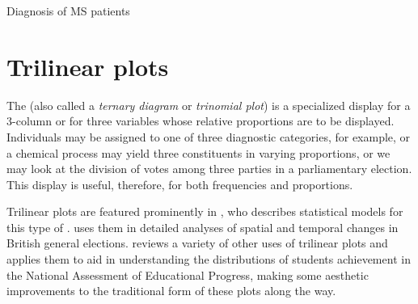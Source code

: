 \documentclass[10pt,krantz2]{krantz}\usepackage[]{graphicx}\usepackage[]{color}
\begin{document}
\begin{Example}[MS2]{Diagnosis of MS patients}

\end{Example}

\section{Trilinear plots}\label{sec:twoway-trilinear}

The 
(also called a \emph{ternary diagram} or \emph{trinomial plot})
is a specialized display for a 3-column \ctab or for
three variables whose relative proportions are to be displayed.
Individuals may be assigned to one of three diagnostic categories,
for example, or a chemical process may yield three constituents
in varying proportions, or we may look at the division of votes
among three parties in a parliamentary election.
This display is useful, therefore, for both frequencies
and proportions.

Trilinear plots are featured prominently in \citet{Aitchison:86},
who describes statistical models for this type of
.  \citet{Upton:76,Upton:94}
uses them in detailed analyses of spatial and temporal changes in
British general elections.
\citet{Wainer:96} reviews a variety of other uses of trilinear
plots and applies them to aid in understanding the distributions
of students achievement in the
National Assessment of Educational Progress,
making some aesthetic improvements to the traditional form of these
plots along the way.
\end{document}
